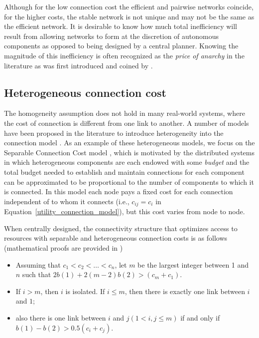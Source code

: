 \documentclass[journal,onecolumn]{IEEEtran}
\theoremstyle{plain}
\begin{document}
Although for the low connection cost the efficient and pairwise networks coincide, for the higher costs, the stable network is not unique and may not be the same as the efficient network. It is desirable to know how much total inefficiency will result from allowing networks to form at the discretion of autonomous components as opposed to being designed by a central planner. Knowing the magnitude of this inefficiency is often recognized as the \textit{price of anarchy} in the literature as was first introduced and coined by \cite{papadimitriou2001algorithms}. 



\subsection{Heterogeneous connection cost}

The homogeneity assumption does not hold in many real-world systems, where the cost of connection is different from one link to another. A number of models have been proposed in the literature to introduce heterogeneity into the connection model \citep{galeotti2006network, jackson2005economics, vandenbossche2013network}. As an example of these heterogeneous models, we focus on the Separable Connection Cost model \citep{heydari2015efficient}, which is motivated by the distributed systems in which heterogeneous components are each endowed with some \textit{budget} and the total budget needed to establish and maintain connections for each component can be approximated to be proportional to the number of components to which it is connected. In this model each node pays a fixed cost for each connection independent of to whom it connects (i.e., $c_{ij}=c_i$ in Equation~\ref{utility_connection_model}), but this cost varies from node to node.

When centrally designed, the connectivity structure that optimizes access to resources with separable and heterogeneous connection costs is as follows (mathematical proofs are provided in \cite{heydari2015efficient} )
\begin{itemize}
\item Assuming that $c_1<c_2<\dots<c_n$, let $m$ be the largest integer between 1 and $n$ such that $2b(1) + 2(m-2)b(2) > (c_m + c_1)$. 
\item If $i > m$, then $i$ is isolated. If $i \leq m$, then there is exactly one link between $i$ and $1$; 
\item also there is one link between $i$ and $j (1 < i,j \leq m)$ if and only if $b(1)-b(2) > 0.5(c_i + c_j)$.

\end{itemize}
\end{document}
